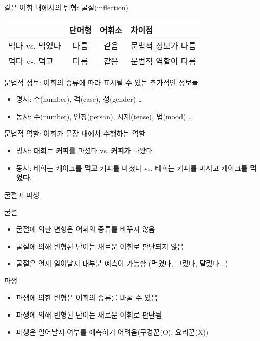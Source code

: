 \documentclass[11pt, aspectratio=169]{beamer}
\begin{document}
\begin{frame}[t]{같은 어휘 내에서의 변형: 굴절(inflection)}
  \begin{center}
    \begin{tabular}{lccl}
      \hline
      & \textbf{단어형} & \textbf{어휘소} & 차이점 \\
      \hline
      먹다 vs. 먹었다 & 다름 & 같음 & 문법적 정보가 다름 \\
      먹다 vs. 먹고 & 다름 & 같음 & 문법적 역할이 다름 \\      
      \hline
    \end{tabular}
  \end{center}
  \begin{block}{문법적 정보: 어휘의 종류에 따라 표시될 수 있는 추가적인 정보들}
    \begin{itemize}
      \item 명사: 수(number), 격(case), 성(gender) \dots
      \item 동사: 수(number), 인칭(person), 시제(tense), 법(mood) \dots
    \end{itemize}
  \end{block}
  \begin{block}{문법적 역할: 어휘가 문장 내에서 수행하는 역할}
    \begin{itemize}
      \item 명사: 태희는 \textbf{커피를} 마셨다 vs. \textbf{커피가} 나왔다
      \item 동사: 태희는 케이크를 \textbf{먹고} 커피를 마셨다 vs. 태희는 커피를 마시고 케이크를 \textbf{먹었다}.
    \end{itemize}
  \end{block}
\end{frame}

\begin{frame}[t]{굴절과 파생}
  \begin{block}{굴절}
    \begin{itemize}
      \item 굴절에 의한 변형은 어휘의 종류를 바꾸지 않음
      \item 굴절에 의해 변형된 단어는 새로운 어휘로 판단되지 않음
      \item 굴절은 언제 일어날지 대부분 예측이 가능함 (먹었다, 그렸다, 달렸다...)
    \end{itemize}
  \end{block}
  \begin{block}{파생}
    \begin{itemize}
      \item 파생에 의한 변형은 어휘의 종류를 바꿀 수 있음
      \item 파생에 의해 변형된 단어는 새로운 어휘로 판단됨
      \item 파생은 일어날지 여부를 예측하기 어려움(구경꾼(O), 요리꾼(X))
    \end{itemize}
  \end{block}
\end{frame}
\end{document}
